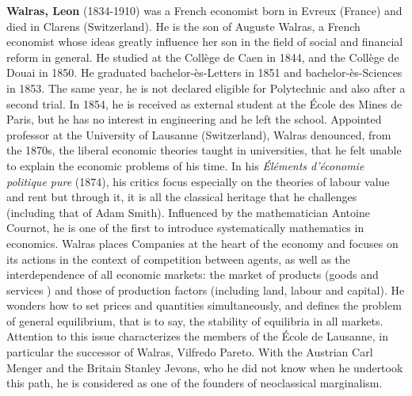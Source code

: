 \textbf{Walras, Leon} (1834-1910) was a French economist born in Evreux (France) and died in Clarens (Switzerland). He is the son of Auguste Walras, a French economist whose ideas greatly influence her son in the field of social and financial reform in general. He studied at the Collège de Caen in 1844, and the Collège de Douai in 1850. He graduated bachelor-ès-Letters in 1851 and bachelor-ès-Sciences in 1853. The same year, he is not declared eligible for Polytechnic and also after a second trial. In 1854, he is received as external student at the École des Mines de Paris, but he has no interest in engineering and he left the school. Appointed professor at the University of Lausanne (Switzerland), Walras denounced, from the 1870s, the liberal economic theories taught in universities, that he felt unable to explain the economic problems of his time. In his \textit{Éléments d'économie politique pure} (1874), his critics focus especially on the theories of labour value and rent but through it, it is all the classical heritage that he challenges (including that of Adam Smith). Influenced by the mathematician Antoine Cournot, he is one of the first to introduce systematically mathematics in economics. Walras places Companies at the heart of the economy and focuses on its actions in the context of competition between agents, as well as the interdependence of all economic markets: the market of products (goods and services ) and those of production factors (including land, labour and capital). He wonders how to set prices and quantities simultaneously, and defines the problem of general equilibrium, that is to say, the stability of equilibria in all markets. Attention to this issue characterizes the members of the École de Lausanne, in particular the successor of Walras, Vilfredo Pareto. With the Austrian Carl Menger and the Britain Stanley Jevons, who he did not know when he undertook this path, he is considered as one of the founders of neoclassical marginalism.

